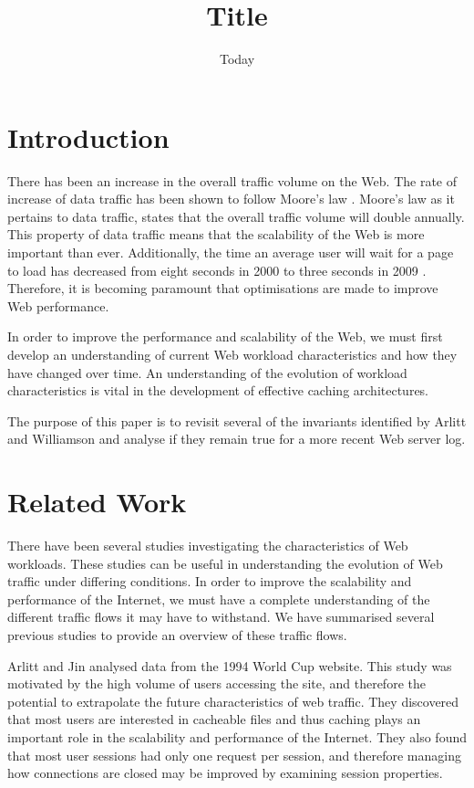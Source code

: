 \documentclass[10pt,conference]{IEEEtran}
\title{Title}
\author{\IEEEauthorblockN{Chelsea Farley, Ryan Lewis, David Armstrong, Rina Gao and Ryunosuke Madenokoji}
\IEEEauthorblockA{The University of Auckland}}
\date{Today}
\begin{document}
\maketitle

\begin{abstract}
\end{abstract}

\section{Introduction}
There has been an increase in the overall traffic volume on the Web. The rate of increase of data traffic has been shown to follow Moore's law \cite{williams05}. Moore's law as it pertains to data traffic, states that the overall traffic volume will double annually. This property of data traffic means that the scalability of the Web is more important than ever. Additionally, the time an average user will wait for a page to load has decreased from eight seconds in 2000 to three seconds in 2009 \cite{Butkiewicz}. Therefore, it is becoming paramount that optimisations are made to improve Web performance.

In order to improve the performance and scalability of the Web, we must first develop an understanding of current Web workload characteristics and how they have changed over time. An understanding of the evolution of workload characteristics is vital in the development of effective caching architectures.

The purpose of this paper is to revisit several of the invariants identified by Arlitt and Williamson \cite{keynote} and analyse if they remain true for a more recent Web server log.

\section{Related Work}
There have been several studies investigating the characteristics of Web workloads. These studies can be useful in understanding the evolution of Web traffic under differing conditions. In order to improve the scalability and performance of the Internet, we must have a complete understanding of the different traffic flows it may have to withstand. We have summarised several previous studies to provide an overview of these traffic flows. 

Arlitt and Jin \cite{world_cup} analysed data from the 1994 World Cup website. This study was motivated by the high volume of users accessing the site, and therefore the potential to extrapolate the future characteristics of web traffic. They discovered that most users are interested in cacheable files and thus caching plays an important role in the scalability and performance of the Internet. They also found that most user sessions had only one request per session, and therefore managing how connections are closed may be improved by examining session properties.
\end{document}
